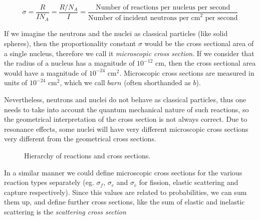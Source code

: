 \begin{equation}\label{eq:sigma}
\sigma=\frac{R}{IN_A}=\frac{R/N_A}{I}=\frac{\text{Number of reactions per nucleus per second}}{\text{Number of incident neutrons per cm}^2\text{ per second}}
\end{equation}

If we imagine the neutrons and the nuclei as classical particles (like solid spheres), then the proportionality constant $\sigma$ would be the cross sectional area of a single nucleus, therefore we call it \textit{microscopic cross section}. If we consider that the radius of a nucleus has a magnitude of $10^{-12}$ cm, then the cross sectional area would have a magnitude of $10^{-24}$ cm$^2$. Microscopic cross sections are measured in units of $10^{-24}$ cm$^2$, which we call $barn$ (often shorthanded as $b$).

Nevertheless, neutrons and nuclei do not behave as classical particles, thus one needs to take into account the quantum mechanical nature of such reactions, so the geometrical interpretation of the cross section is not always correct. Due to resonance effects, some nuclei will have very different microscopic cross sections very different from the geometrical cross sections. 


\begin{figure}[ht!]
\protect {}\protect
\caption{\label{fig:xshierarchy} \footnotesize{Hierarchy of reactions and cross sections.}}
\end{figure}

In a similar manner we could define microscopic cross sections for the various reaction types separately (eg. $\sigma_f$, $\sigma_e$ and $\sigma_c$ for fission, elastic scattering and capture respectively). Since this values are related to probabilities, we can sum them up, and define further cross sections, like the sum of elastic and inelastic scattering is the \textit{scattering cross section}

